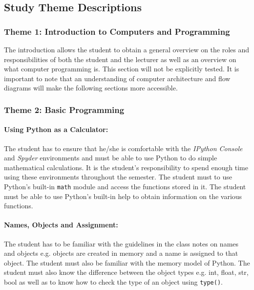     \subsection{Study Theme Descriptions}
        \subsubsection{Theme 1: Introduction to Computers and Programming}
        The introduction allows the student to obtain a general
        overview on the roles and responsibilities of both the student
        and the lecturer as well as an overview on what computer
        programming is.  This section will not be explicitly
        tested. It is important to note that an understanding of
        computer architecture and flow diagrams will make the
        following sections more accessible.

        \subsubsection{Theme 2: Basic Programming}
            \paragraph{Using Python as a Calculator:}
            The student has to ensure that he/she is comfortable with
            the \emph{IPython Console} and \emph{Spyder} environments
            and must be able to use Python to do simple mathematical
            calculations.  It is the student's responsibility to spend
            enough time using these environments throughout the
            semester.  The student must to use Python's built-in
            \texttt{math} module and access the functions stored in
            it. The student must be able to use Python's built-in help
            to obtain information on the various functions.

            \paragraph{Names, Objects and Assignment:}
            The student has to be familiar with the guidelines in the
            class notes on names and objects e.g. objects are created
            in memory and a name is assigned to that object. The
            student must also be familiar with the memory model of
            Python. The student must also know the difference between
            the object types e.g. int, float, str, bool as well as to
            know how to check the type of an object using
            \texttt{type()}.

